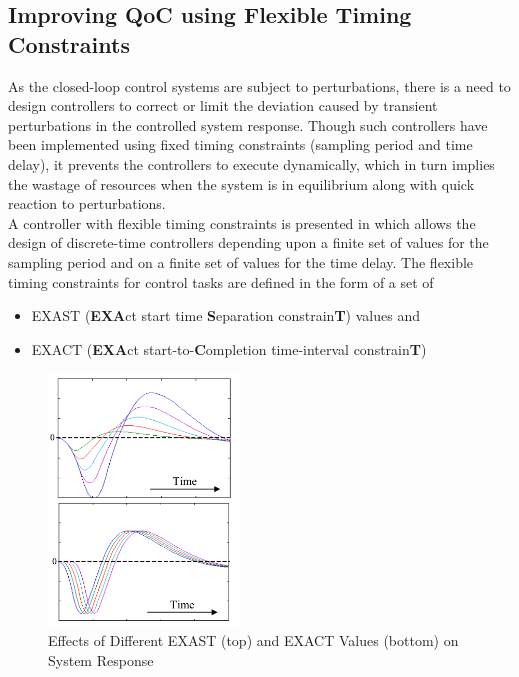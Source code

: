 \documentclass[12pt]{report}
\begin{document}
\subsection{Improving QoC using Flexible Timing Constraints}
As the closed-loop control systems are subject to perturbations, there is a need to design controllers to correct or limit the deviation caused by transient perturbations in the controlled system response. Though such controllers have been implemented using fixed timing constraints (sampling period and time delay), it prevents the controllers to execute dynamically, which in turn implies the wastage of resources when the system is in equilibrium along with quick reaction to perturbations. \\ 

A controller with flexible timing constraints is presented in \cite{qoc} which allows the design of discrete-time controllers depending upon a finite set of values for the sampling period and on a finite set of values for the time delay.  The flexible timing constraints for control tasks are defined in the form of a set of
\begin{itemize}
\item EXAST (\textbf{EXA}ct start time \textbf{S}eparation constrain\textbf{T}) values and 
\item EXACT (\textbf{EXA}ct start-to-\textbf{C}ompletion time-interval constrain\textbf{T})
\end{itemize} 

\begin{figure}[h]
    \centering
    \includegraphics[width=0.45\textwidth]{images/exact.png}
    \caption[Effects of Different EXAST and EXACT Values on System Response]{Effects of Different EXAST (top) and EXACT Values (bottom) on System Response \cite{qoc}}
\label{fig:exact}
\end{figure}
\end{document}
